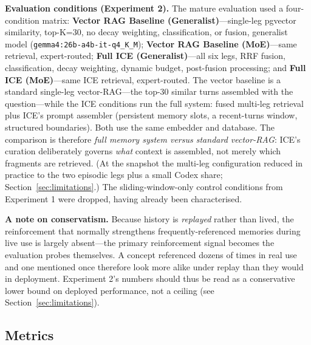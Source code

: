 \documentclass[10pt]{article}
\begin{document}
\textbf{Evaluation conditions (Experiment 2).} The mature evaluation used a four-condition matrix: \textbf{Vector RAG Baseline (Generalist)}---single-leg pgvector similarity, top-K=30, no decay weighting, classification, or fusion, generalist model (\texttt{gemma4:26b-a4b-it-q4\_K\_M}); \textbf{Vector RAG Baseline (MoE)}---same retrieval, expert-routed; \textbf{Full ICE (Generalist)}---all six legs, RRF fusion, classification, decay weighting, dynamic budget, post-fusion processing; and \textbf{Full ICE (MoE)}---same ICE retrieval, expert-routed. The vector baseline is a standard single-leg vector-RAG---the top-30 similar turns assembled with the question---while the ICE conditions run the full system: fused multi-leg retrieval plus ICE's prompt assembler (persistent memory slots, a recent-turns window, structured boundaries). Both use the same embedder and database. The comparison is therefore \emph{full memory system versus standard vector-RAG}: ICE's curation deliberately governs \emph{what} context is assembled, not merely which fragments are retrieved. (At the snapshot the multi-leg configuration reduced in practice to the two episodic legs plus a small Codex share; Section~\ref{sec:limitations}.) The sliding-window-only control conditions from Experiment 1 were dropped, having already been characterised.

\textbf{A note on conservatism.} Because history is \emph{replayed} rather than lived, the reinforcement that normally strengthens frequently-referenced memories during live use is largely absent---the primary reinforcement signal becomes the evaluation probes themselves. A concept referenced dozens of times in real use and one mentioned once therefore look more alike under replay than they would in deployment. Experiment 2's numbers should thus be read as a conservative lower bound on deployed performance, not a ceiling (see Section~\ref{sec:limitations}).

\subsection{Metrics}
\end{document}
